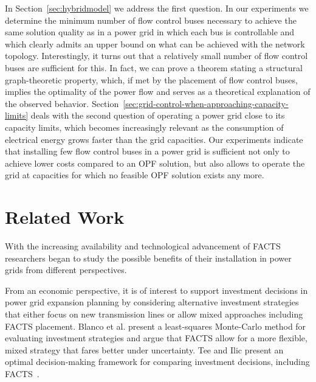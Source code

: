 \documentclass{article}[11pt,a4paper]
\begin{document}
In Section~\ref{sec:hybridmodel} we address the first question. 
In our experiments we determine the minimum number of flow control buses necessary to achieve the same solution quality as in a power grid in which each bus is controllable and which clearly admits an upper bound on what can be achieved with the network topology. 
Interestingly, it turns out that a relatively small number of flow control buses are sufficient for this.
In fact, we can prove a theorem stating a structural graph-theoretic property, which, if met by the placement of flow control buses, implies the optimality of the power flow and serves as a theoretical explanation of the observed behavior.
Section~\ref{sec:grid-control-when-approaching-capacity-limits} deals with the second question of operating a power grid close to its capacity limits, which becomes increasingly relevant as the consumption of electrical energy grows faster than the grid capacities.
Our experiments indicate that installing few flow control buses in a power grid is sufficient not only to achieve  lower costs compared to an OPF solution, but also allows to operate the grid at capacities for which no feasible OPF solution exists any more.
\section{Related Work}
\label{sec:related-work}
With the increasing availability and technological advancement of
FACTS researchers began to study the possible benefits of their
installation in power grids from different perspectives.

From an economic perspective, it is of interest to support investment
decisions in power grid expansion planning by considering alternative
investment strategies that either focus on new transmission lines or
allow mixed approaches including FACTS placement.  Blanco et
al. \cite{bogr-rovfi-11} present a least-squares Monte-Carlo method
for evaluating investment strategies and argue that FACTS allow for a
more flexible, mixed strategy that fares better under uncertainty.
Tee and Ilic present an optimal decision-making framework for
comparing investment decisions, including FACTS~\cite{ti-oidte-12}.
\end{document}

